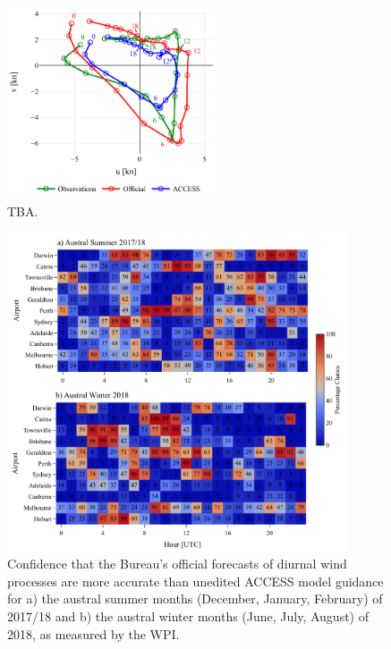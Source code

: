 \documentclass[10pt]{article}
\begin{document}
\begin{figure}
\centering
\includegraphics[keepaspectratio=true,width=0.55\textwidth]{clim_winds_austral_winter_ACCESS.pdf}
\caption{TBA.}
\label{Fig:airport_wpi_access}
\end{figure}

\begin{figure}
\centering
\includegraphics[keepaspectratio=true,width=0.90\textwidth]{airport_wpi_access.pdf}
\caption{Confidence that the Bureau's official forecasts of diurnal wind processes are more accurate than unedited ACCESS model guidance for a) the austral summer months (December, January, February) of 2017/18 and b) the austral winter months (June, July, August) of 2018, as measured by the WPI.}
\label{Fig:airport_wpi_access}
\end{figure}
\end{document}
